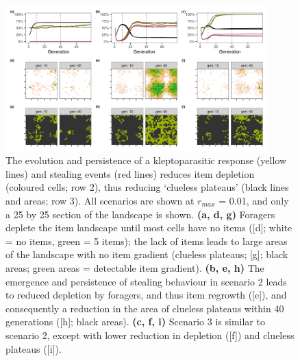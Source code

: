 \documentclass[11pt]{article}
\begin{document}
\begin{figure}[h!]
    \centering
    \includegraphics[width=0.90\textwidth]{figures/fig_06_landscape_effect.png}
    \caption{
        The evolution and persistence of a kleptoparasitic response (yellow lines) and stealing events (red lines) reduces item depletion (coloured cells; row 2), thus reducing `clueless plateaus' (black lines and areas; row 3). All scenarios are shown at $r_{max}$ = 0.01, and only a 25 by 25 section of the landscape is shown.
        \textbf{(a, d, g)} Foragers deplete the item landscape until most cells have no items ([d]; white = no items, green = 5 items); the lack of items leads to large areas of the landscape with no item gradient (clueless plateaus; [g]; black areas; green areas = detectable item gradient).
        \textbf{(b, e, h)} The emergence and persistence of stealing behaviour in scenario 2 leads to reduced depletion by foragers, and thus item regrowth ([e]), and consequently a reduction in the area of clueless plateaus within 40 generations ([h]; black areas).
        \textbf{(c, f, i)} Scenario 3 is similar to scenario 2, except with lower reduction in depletion ([f]) and clueless plateaus ([i]).
    }
    \label{Fig:CluelessLandscape}
\end{figure}




\renewcommand{\figurename}{Video} 
\setcounter{figure}{0}
\end{document}
